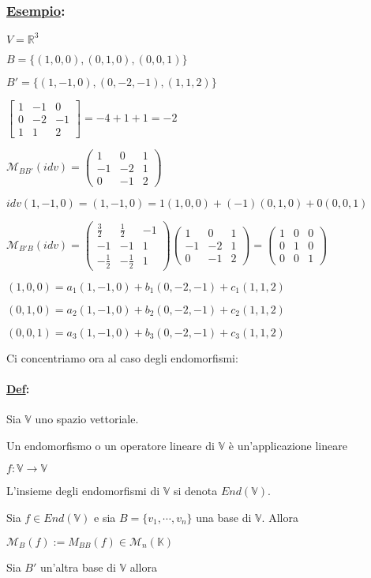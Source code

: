 \documentclass{article}
\newcommand{\ul}[1]{\underline{#1}}
\newcommand{\R}{\mathbb{R}}
\newcommand{\K}{\mathbb{K}}
\newcommand{\V}{\mathbb{V}}
\newcommand{\M}{\mathcal{M}}
\newcommand{\Def}[2]{\paragraph{\ul{Def}:}#1\\\hspace*{3em}\begin{minipage}{.8\textwidth}#2\end{minipage}}
\newcommand{\Esempio}[1]{\subsubsection*{\ul{Esempio}:}#1}
\begin{document}
\Esempio{
	$V=\R^3$

	$B=\{(1,0,0),(0,1,0),(0,0,1)\}$

	$B'=\{(1,-1,0),(0,-2,-1),(1,1,2)\}$

	$\begin{bmatrix}
			1 & -1 & 0  \\
			0 & -2 & -1 \\
			1 & 1  & 2
		\end{bmatrix}=-4+1+1=-2$

	$\M_{BB'}(idv)=\begin{pmatrix}
			1  & 0  & 1 \\
			-1 & -2 & 1 \\
			0  & -1 & 2
		\end{pmatrix}$

	$idv(1,-1,0)=(1,-1,0)=1(1,0,0)+(-1)(0,1,0)+0(0,0,1)$

	$\M_{B'B}(idv)=\begin{pmatrix}
			\frac{3}{2}  & \frac{1}{2}  & -1 \\
			-1           & -1           & 1  \\
			-\frac{1}{2} & -\frac{1}{2} & 1
		\end{pmatrix}\begin{pmatrix}
			1  & 0  & 1 \\
			-1 & -2 & 1 \\
			0  & -1 & 2
		\end{pmatrix}=\begin{pmatrix}
			1 & 0 & 0 \\
			0 & 1 & 0 \\
			0 & 0 & 1
		\end{pmatrix}$

	$(1,0,0)=a_1(1,-1,0)+b_1(0,-2,-1)+c_1(1,1,2)$

	$(0,1,0)=a_2(1,-1,0)+b_2(0,-2,-1)+c_2(1,1,2)$

	$(0,0,1)=a_3(1,-1,0)+b_3(0,-2,-1)+c_3(1,1,2)$
}

Ci concentriamo ora al caso degli endomorfismi:
\Def{Sia $\V$ uno spazio vettoriale.}{
	Un endomorfismo o un operatore lineare di $\V$ è un'applicazione lineare

	$f:\V\rightarrow\V$

	L'insieme degli endomorfismi di $\V$ si denota $End(\V)$.
}

Sia $f\in End(\V)$ e sia $B=\{v_1,\cdots,v_n\}$ una base di $\V$. Allora

$\M_B(f):=M_{BB}(f)\in\M_n(\K)$

Sia $B'$ un'altra base di $\V$ allora
\end{document}
